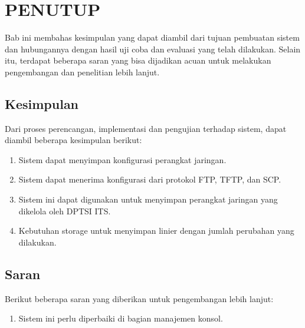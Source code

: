 \chapter{PENUTUP}
    Bab ini membahas kesimpulan yang dapat diambil dari tujuan pembuatan sistem dan hubungannya dengan hasil uji coba dan evaluasi yang telah dilakukan. Selain itu, terdapat beberapa saran yang bisa dijadikan acuan untuk melakukan pengembangan dan penelitian lebih lanjut.
        
	\section{Kesimpulan}
        Dari proses perencangan, implementasi dan pengujian terhadap sistem, dapat diambil beberapa kesimpulan berikut:
		\begin{enumerate}
			\item Sistem dapat menyimpan konfigurasi perangkat jaringan.
			\item Sistem dapat menerima konfigurasi dari protokol FTP, TFTP, dan SCP.
            \item Sistem ini dapat digunakan untuk menyimpan perangkat jaringan yang dikelola oleh DPTSI ITS.
            \item Kebutuhan storage untuk menyimpan linier dengan jumlah perubahan yang dilakukan.
		\end{enumerate}
        
	\section{Saran}
		Berikut beberapa saran yang diberikan untuk pengembangan lebih lanjut:
		\begin{enumerate}
			\item Sistem ini perlu diperbaiki di bagian manajemen konsol. 
		\end{enumerate}